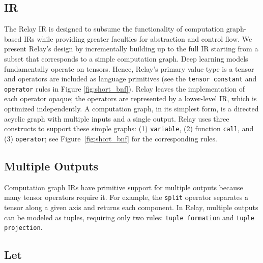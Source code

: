   \subsection{IR}
  

  The Relay IR is designed
    to subsume the functionality of computation graph-based IRs
    while providing greater faculties for abstraction and control flow.
  We present Relay's design by incrementally building up to the full IR
    starting from a subset that corresponds to a simple computation graph.
  Deep learning models fundamentally operate on tensors.
  Hence, Relay's primary value type is a tensor and operators are included as language primitives
    (see the \verb|tensor constant| and \verb|operator| rules in Figure \ref{fig:short_bnf}).
  Relay leaves the implementation of each operator opaque; the operators
    are represented by a lower-level IR, which is optimized independently.
  A computation graph, in its simplest form, is a directed acyclic
    graph with multiple inputs and a single output.
  Relay uses three constructs to support these simple graphs:
    (1) \verb|variable|, (2) function \verb|call|,
    and (3) \verb|operator|; see Figure~\ref{fig:short_bnf} for the corresponding rules.

  \subsection*{Multiple Outputs}

  Computation graph IRs have primitive support for multiple outputs
    because many tensor operators require it.
  For example, the \verb|split| operator separates a tensor along a given axis
    and returns each component.
  In Relay, multiple outputs can be modeled as tuples,
    requiring only two rules: \verb|tuple formation| and \verb|tuple projection|.

  \subsection*{Let}

